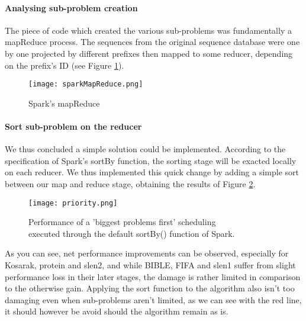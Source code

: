 \documentclass{eplmastersthesis}
\begin{document}
\paragraph{Analysing sub-problem creation}

The piece of code which created the various sub-problems was fundamentally a mapReduce process. The sequences from the original sequence database were one by one projected by different prefixes then mapped to some reducer, depending on the prefix's ID (see Figure \ref{fig:sparkMapReduce}). \newline

\begin{figure}[h]
  \centering
  \texttt{[image: sparkMapReduce.png]}
  \caption{Spark's mapReduce}
  \label{fig:sparkMapReduce}
\end{figure}

\paragraph{Sort sub-problem on the reducer}

We thus concluded a simple solution could be implemented. According to the specification of Spark's sortBy function, the sorting stage will be exacted locally on each reducer. We thus implemented this quick change by adding a simple sort between our map and reduce stage, obtaining the results of Figure \ref{fig:priority_scheduling_performance_comparison}. \newline

\begin{figure}[h]
  \centering
  \texttt{[image: priority.png]}
  \caption[Naive priority scheduling]{
  		Performance of a 'biggest problems first' scheduling \\
  		executed through the default sortBy() function of Spark.
  	\endtabular
  }
  \label{fig:priority_scheduling_performance_comparison}
\end{figure}

As you can see, net performance improvements can be observed, especially for Kosarak, protein and slen2, and while BIBLE, FIFA and slen1 suffer from slight performance loss in their later stages, the damage is rather limited in comparison to the otherwise gain. Applying the sort function to the algorithm also isn't too damaging  even when sub-problems aren't limited, as we can see with the red line, it should however be avoid should the algorithm remain as is.\newline
\end{document}
